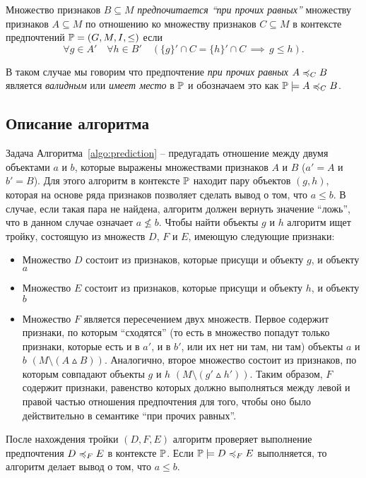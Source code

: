 		\begin{definition}
			Множество признаков $B \subseteq M$ \emph{предпочитается \enquote{при прочих равных}} множеству признаков $A \subseteq M$ по отношению ко множеству признаков $C \subseteq M$ в контексте предпочтений $\mathbb{P} = (G, M, I, \leq)$ если 
			\begin{equation}
			\forall g \in A' \quad \forall h \in B' \quad (\{g\}' \cap C = \{h\}' \cap C \, \implies \, g \leq h).
			\end{equation}
			
			В таком случае мы говорим что предпочтение \emph{при прочих равных} $A \preccurlyeq_{C} B$ является \emph{валидным} или \emph{имеет место} в $\mathbb{P}$ и обозначаем это как $\mathbb{P} \models A \preccurlyeq_{C} B$.
		\end{definition}
	
	\subsection{Описание алгоритма}
	\label{subsec:cp_description}
		Задача Алгоритма~\ref{algo:prediction} – предугадать отношение между двумя объектами $a$ и $b$, которые выражены множествами признаков $A$ и $B$ ($a' = A$ и $b' = B$). Для этого алгоритм в контексте $\mathbb{P}$ находит пару объектов $(g, h)$, которая на основе ряда признаков позволяет сделать вывод о том, что $a \leq b$. В случае, если такая пара не найдена, алгоритм должен вернуть значение ``ложь'', что в данном случае означает $a \nleq b$. Чтобы найти объекты $g$ и $h$ алгоритм ищет тройку, состоящую из множеств $D$, $F$ и $E$, имеющую следующие признаки:
		\begin{itemize}
			\item Множество $D$ состоит из признаков, которые присущи и объекту $g$, и объекту $a$
			\item Множество $E$ состоит из признаков, которые присущи и объекту $h$, и объекту $b$
			\item Множество $F$ является пересечением двух множеств. Первое содержит признаки, по которым ``сходятся'' (то есть в множество попадут только признаки, которые есть и в $a'$, и в $b'$, или их нет ни там, ни там) объекты $a$ и $b$ $(M \setminus (A \vartriangle B))$. Аналогично, второе множество состоит из признаков, по которым совпадают объекты $g$ и $h$ $(M \setminus (g' \vartriangle h'))$. Таким образом, $F$ содержит признаки, равенство которых должно выполняться между левой и правой частью отношения предпочтения для того, чтобы оно было действительно в семантике \enquote{при прочих равных}.
		\end{itemize}
		После нахождения тройки $(D,F,E)$ алгоритм проверяет выполнение предпочтения $D \preccurlyeq_{F} E$ в контексте $\mathbb{P}$. Если $\mathbb{P} \models D \preccurlyeq_{F} E$ выполняется, то алгоритм делает вывод о том, что $a \leq b$.
	
